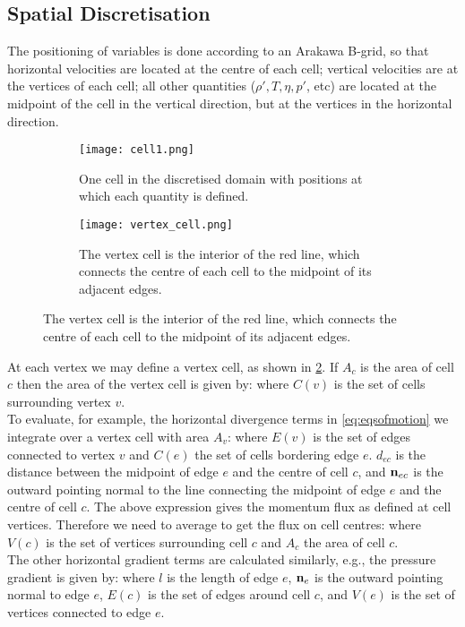 \subsection{Spatial Discretisation}
The positioning of variables is done according to an Arakawa B-grid, so that horizontal velocities are located at the centre of each cell; vertical velocities are at the vertices of each cell; all other quantities ($\rho', T, \eta, p'$, etc) are located at the midpoint of the cell in the vertical direction, but at the vertices in the horizontal direction. 
\begin{figure}[H]
  \centering
  \begin{subfigure}{0.45\textwidth}
  \texttt{[image: cell1.png]}
    \captionsetup{width=.8\linewidth}
  \caption{\footnotesize One cell in the discretised domain with positions at which each quantity is defined.}
  \end{subfigure}%
  \begin{subfigure}{0.45\textwidth}
   \texttt{[image: vertex\_cell.png]}
   \captionsetup{width=.8\linewidth}
   \caption{The vertex cell is the interior of the red line, which connects the centre of each cell to the midpoint of its adjacent edges.} 
   \label{fig:vertexcell}
  \end{subfigure}
\end{figure}
At each vertex we may define a vertex cell, as shown in \cref{fig:vertexcell}. If $A_{c}$ is the area of cell $c$ then the area of the vertex cell is given by:
where $C(v)$ is the set of cells surrounding vertex $v$. \\
\linebreak
To evaluate, for example, the horizontal divergence terms in \cref{eq:eqsofmotion} we integrate over a vertex cell with area $A_{v}$:
where $E(v)$ is the set of edges connected to vertex $v$ and $C(e)$ the set of cells bordering edge $e$. $d_{ec}$ is the distance between the midpoint of edge $e$ and the centre of cell $c$, and $\mathbf{n}_{ec}$ is the outward pointing normal to the line connecting the midpoint of edge $e$ and the centre of cell $c$. The above expression gives the momentum flux as defined at cell vertices. Therefore we need to average to get the flux on cell centres:
where $V(c)$ is the set of vertices surrounding cell $c$ and $A_{c}$ the area of cell $c$.\\
\linebreak
The other horizontal gradient terms are calculated similarly, e.g., the pressure gradient is given by:
where $l$ is the length of edge $e$, $\mathbf{n}_{e}$ is the outward pointing normal to edge $e$, $E(c)$ is the set of edges around cell $c$, and $V(e)$ is the set of vertices connected to edge $e$.
